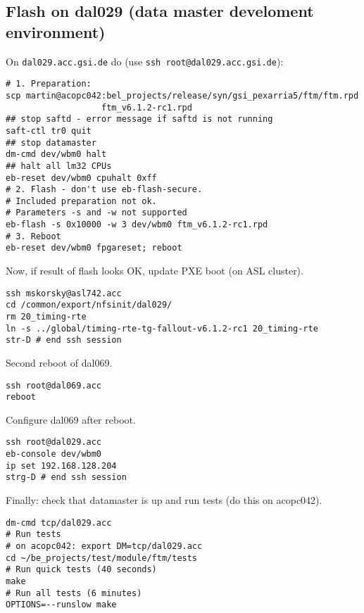 \documentclass[12pt,a4paper]{report}
\begin{document}
\subsection{Flash on dal029 (data master develoment environment)}
On \texttt{dal029.acc.gsi.de} do (use \texttt{ssh root@dal029.acc.gsi.de}):
\begin{verbatim}
# 1. Preparation:
scp martin@acopc042:bel_projects/release/syn/gsi_pexarria5/ftm/ftm.rpd
                   ftm_v6.1.2-rc1.rpd
## stop saftd - error message if saftd is not running
saft-ctl tr0 quit
## stop datamaster
dm-cmd dev/wbm0 halt
## halt all lm32 CPUs
eb-reset dev/wbm0 cpuhalt 0xff
# 2. Flash - don't use eb-flash-secure.
# Included preparation not ok.
# Parameters -s and -w not supported
eb-flash -s 0x10000 -w 3 dev/wbm0 ftm_v6.1.2-rc1.rpd
# 3. Reboot
eb-reset dev/wbm0 fpgareset; reboot
\end{verbatim}
Now, if result of flash looks OK, update PXE boot (on ASL cluster).
\begin{verbatim}
ssh mskorsky@asl742.acc
cd /common/export/nfsinit/dal029/
rm 20_timing-rte
ln -s ../global/timing-rte-tg-fallout-v6.1.2-rc1 20_timing-rte
str-D # end ssh session
\end{verbatim}
Second reboot of dal069.
\begin{verbatim}
ssh root@dal069.acc
reboot
\end{verbatim}
Configure dal069 after reboot.
\begin{verbatim}
ssh root@dal029.acc
eb-console dev/wbm0
ip set 192.168.128.204
strg-D # end ssh session
\end{verbatim}
Finally: check that datamaster is up and run tests (do this on acopc042).
\begin{verbatim}
dm-cmd tcp/dal029.acc
# Run tests
# on acopc042: export DM=tcp/dal029.acc
cd ~/be_projects/test/module/ftm/tests
# Run quick tests (40 seconds)
make
# Run all tests (6 minutes)
OPTIONS=--runslow make
\end{verbatim}
\end{document}
